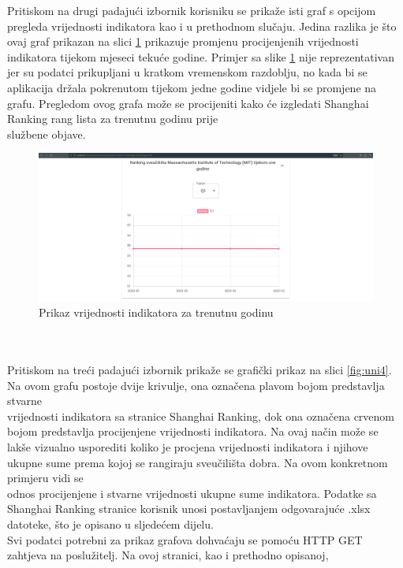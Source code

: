 \documentclass[times, utf8, zavrsni]{fer}
\begin{document}
Pritiskom na drugi padajući izbornik korisniku se prikaže isti graf s opcijom pregleda vrijednosti indikatora
kao i u prethodnom slučaju. Jedina razlika je što ovaj graf prikazan na slici \ref{fig:uni3}
prikazuje promjenu procijenjenih vrijednosti indikatora tijekom mjeseci tekuće godine. Primjer sa slike \ref{fig:uni3} nije reprezentativan jer su podatci 
prikupljani u kratkom vremenskom razdoblju, no kada bi se aplikacija držala pokrenutom tijekom jedne godine vidjele bi se promjene na grafu. Pregledom ovog 
grafa može se procijeniti kako će izgledati Shanghai Ranking rang lista za trenutnu godinu prije \\službene objave. 
\begin{figure}[htb]
    \hspace*{-2cm}  
       \includegraphics[scale=0.21]{uni3.png} 
       \caption{Prikaz vrijednosti indikatora za trenutnu godinu}
       \label{fig:uni3}
       \end{figure} 
\\\\Pritiskom na treći padajući izbornik prikaže se grafički prikaz na slici \ref{fig:uni4}. Na ovom grafu postoje dvije krivulje, ona označena plavom bojom predstavlja 
stvarne \\vrijednosti indikatora sa stranice Shanghai Ranking, dok ona označena crvenom bojom predstavlja procijenjene vrijednosti indikatora.
Na ovaj način može se lakše vizualno usporediti koliko je procjena vrijednosti indikatora i njihove ukupne sume  prema kojoj se rangiraju sveučilišta dobra. 
Na ovom konkretnom primjeru vidi se \\odnos procijenjene i stvarne 
vrijednosti ukupne sume indikatora.
Podatke sa Shanghai Ranking stranice korisnik unosi postavljanjem  
odgovarajuće .xlsx \\datoteke, što je opisano u sljedećem dijelu.
\\Svi podatci potrebni za prikaz grafova dohvaćaju se pomoću HTTP GET zahtjeva na poslužitelj. Na ovoj stranici, kao i prethodno opisanoj, 
\end{document}
